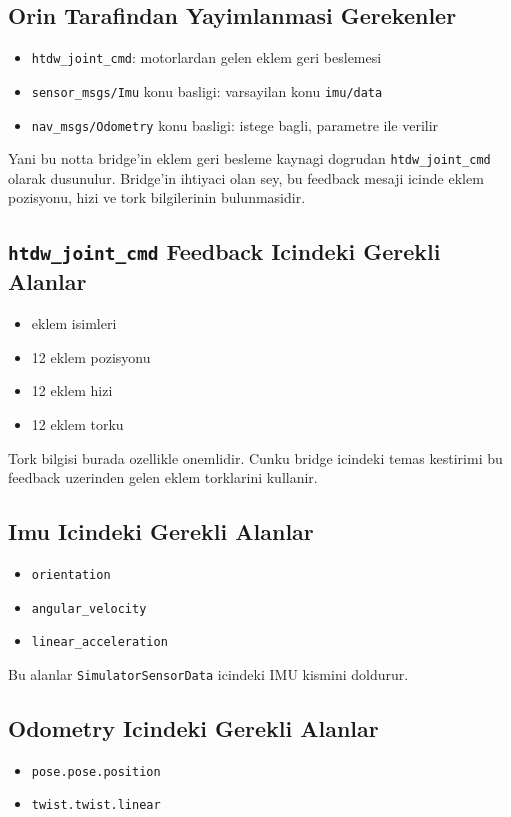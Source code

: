 \documentclass[11pt]{article}
\begin{document}
\subsection*{Orin Tarafindan Yayimlanmasi Gerekenler}
\begin{itemize}
  \item \texttt{htdw\_joint\_cmd}: motorlardan gelen eklem geri beslemesi
  \item \texttt{sensor\_msgs/Imu} konu basligi: varsayilan konu \texttt{imu/data}
  \item \texttt{nav\_msgs/Odometry} konu basligi: istege bagli, parametre ile verilir
\end{itemize}

Yani bu notta bridge'in eklem geri besleme kaynagi dogrudan \texttt{htdw\_joint\_cmd} olarak dusunulur. Bridge'in ihtiyaci olan sey, bu feedback mesaji icinde eklem pozisyonu, hizi ve tork bilgilerinin bulunmasidir.

\subsection*{\texttt{htdw\_joint\_cmd} Feedback Icindeki Gerekli Alanlar}
\begin{itemize}
  \item eklem isimleri
  \item 12 eklem pozisyonu
  \item 12 eklem hizi
  \item 12 eklem torku
\end{itemize}

Tork bilgisi burada ozellikle onemlidir. Cunku bridge icindeki temas kestirimi bu feedback uzerinden gelen eklem torklarini kullanir.

\subsection*{Imu Icindeki Gerekli Alanlar}
\begin{itemize}
  \item \texttt{orientation}
  \item \texttt{angular\_velocity}
  \item \texttt{linear\_acceleration}
\end{itemize}

Bu alanlar \texttt{SimulatorSensorData} icindeki IMU kismini doldurur.

\subsection*{Odometry Icindeki Gerekli Alanlar}
\begin{itemize}
  \item \texttt{pose.pose.position}
  \item \texttt{twist.twist.linear}
\end{itemize}
\end{document}
